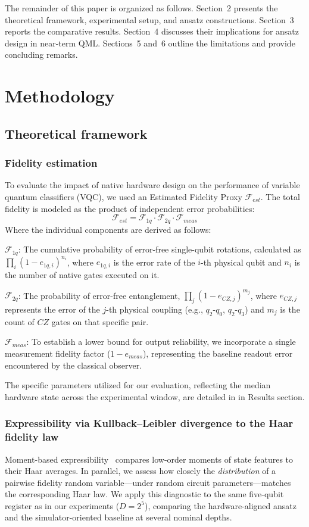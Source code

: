\documentclass[11pt]{article}
\begin{document}
The remainder of this paper is organized as follows. Section~2 presents the theoretical framework, experimental setup, and ansatz constructions. Section~3 reports the comparative results. Section~4 discusses their implications for ansatz design in near-term QML. Sections~5 and~6 outline the limitations and provide concluding remarks.

\section{Methodology}
\subsection{Theoretical framework}
\subsubsection{Fidelity estimation}
To evaluate the impact of native hardware design on the performance of variable quantum classifiers (VQC), we used an Estimated Fidelity Proxy $\mathcal{F}_{est}$. The total fidelity is modeled as the product of independent error probabilities:$$\mathcal{F}_{est} = \mathcal{F}_{1q} \cdot \mathcal{F}_{2q} \cdot \mathcal{F}_{meas}$$Where the individual components are derived as follows:

$\mathcal{F}_{1q}$: The cumulative probability of error-free single-qubit rotations, calculated as $\prod_{i} (1 - e_{1q, i})^{n_i}$, where $e_{1q, i}$ is the error rate of the $i$-th physical qubit and $n_i$ is the number of native gates executed on it.

$\mathcal{F}_{2q}$: The probability of error-free entanglement, $\prod_{j} (1 - e_{CZ, j})^{m_j}$, where $e_{CZ, j}$ represents the error of the $j$-th physical coupling (e.g., $q_2$-$q_0$, $q_2$-$q_3$) and $m_j$ is the count of $CZ$ gates on that specific pair.

$\mathcal{F}_{meas}$: To establish a lower bound for output reliability, we incorporate a single measurement fidelity factor ($1 - e_{meas}$), representing the baseline readout error encountered by the classical observer.

The specific parameters utilized for our evaluation, reflecting the median hardware state across the experimental window, are detailed in in Results section.




\subsubsection{Expressibility via Kullback--Leibler divergence to the Haar fidelity law}
Moment-based expressibility~\cite{sim2019} compares low-order moments of state features to their Haar averages. In parallel, we assess how closely the \emph{distribution} of a pairwise fidelity random variable---under random circuit parameters---matches the corresponding Haar law. We apply this diagnostic to the same five-qubit register as in our experiments ($D=2^{5}$), comparing the hardware-aligned ansatz and the simulator-oriented baseline at several nominal depths.
\end{document}
